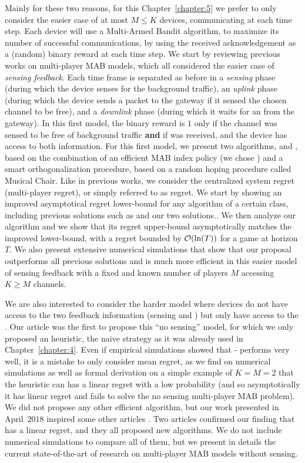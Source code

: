 Mainly for these two reasons, for this Chapter~\ref{chapter:5} we prefer to only consider the easier case of at most $M \leq K$ devices, communicating at each time step.
Each device will use a Multi-Armed Bandit algorithm, to maximize its number of successful communications, by using the received acknowledgement \Ack{} as a (random) binary reward at each time step.
%
We start by reviewing previous works on multi-player MAB models, which all considered the easier case of \emph{sensing feedback}.
Each time frame is separated as before in a \emph{sensing} phase (during which the device senses for the background traffic),
an \emph{uplink} phase (during which the device sends a packet to the gateway if it sensed the chosen channel to be free),
and a \emph{downlink} phase (during which it waits for an \Ack{} from the gateway).
In this first model, the binary reward is $1$ only if the channel was sensed to be free of background traffic \textbf{and} if \Ack{} was received, and the device has access to both information.
For this first model, we present two algorithms, \RandTopM{} and \MCTopM, based on the combination of an efficient MAB index policy (we chose \klUCB) and a smart orthogonalization procedure, based on a random hoping procedure called Musical Chair.
Like in previous works, we consider the centralized system regret (multi-player regret), or simply referred to as regret.
We start by showing an improved asymptotical regret lower-bound for any algorithm of a certain class, including previous solutions such as \rhoRand{} and our two solutions..
We then analyze our \MCTopM{} algorithm and we show that its regret upper-bound asymptotically matches the improved lower-bound, with a regret bounded by $\mathop{}\mathopen{}\mathcal{O}\mathopen{}\left(\ln(T)\right)$ for a game at horizon $T$.
We also present extensive numerical simulations that show that our proposal outperforms all previous solutions and is much more efficient in this easier model of sensing feedback with a fixed and known number of players $M$ accessing $K \geq M$ channels.

We are also interested to consider the harder model where devices do not have access to the two feedback information (sensing and \Ack) but only have access to the \Ack.
Our article \cite{Besson2018ALT} was the first to propose this ``no sensing'' model, for which we only proposed an heuristic, the naive \Selfish{} strategy as it was already used in Chapter~\ref{chapter:4}.
Even if empirical simulations showed that \Selfish-\klUCB{} performs very well, it is a mistake to only consider mean regret, as we find on numerical simulations as well as formal derivation on a simple example of $K=M=2$ that the \Selfish{} heuristic can has a linear regret with a low probability (and so asymptotically it has linear regret and fails to solve the no sensing multi-player MAB problem).
We did not propose any other efficient algorithm, but our work presented in April~$2018$ inspired some other articles \cite{LugosiMehrabian18,BoursierPerchet18}.
Two articles confirmed our finding that \Selfish{} has a linear regret, and they all proposed new algorithms.
We do not include numerical simulations to compare all of them, but we present in details the current state-of-the-art of research on multi-player MAB models without sensing.

